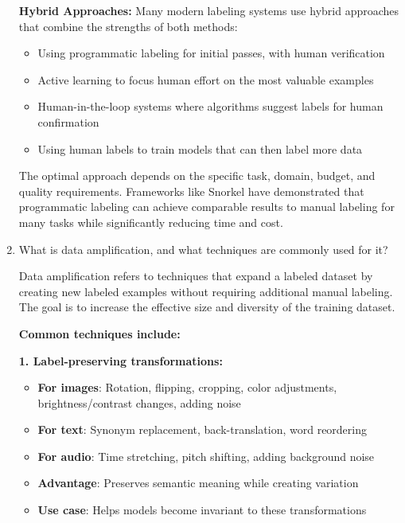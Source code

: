 \documentclass[12pt]{article}
\begin{document}
\begin{enumerate}
\begin{tcolorbox}[colback=blue!5!white,colframe=blue!75!black,title={Solution}]
    \textbf{Hybrid Approaches:}
    Many modern labeling systems use hybrid approaches that combine the strengths of both methods:
    \begin{itemize}
        \item Using programmatic labeling for initial passes, with human verification
        \item Active learning to focus human effort on the most valuable examples
        \item Human-in-the-loop systems where algorithms suggest labels for human confirmation
        \item Using human labels to train models that can then label more data
    \end{itemize}
    
    The optimal approach depends on the specific task, domain, budget, and quality requirements. Frameworks like Snorkel have demonstrated that programmatic labeling can achieve comparable results to manual labeling for many tasks while significantly reducing time and cost.
    \end{tcolorbox}
    
    \item What is data amplification, and what techniques are commonly used for it?
    
    \begin{tcolorbox}[colback=blue!5!white,colframe=blue!75!black,title={Solution}]
    Data amplification refers to techniques that expand a labeled dataset by creating new labeled examples without requiring additional manual labeling. The goal is to increase the effective size and diversity of the training dataset.
    
    \textbf{Common techniques include:}
    
    \textbf{1. Label-preserving transformations:}
    \begin{itemize}
        \item \textbf{For images}: Rotation, flipping, cropping, color adjustments, brightness/contrast changes, adding noise
        \item \textbf{For text}: Synonym replacement, back-translation, word reordering
        \item \textbf{For audio}: Time stretching, pitch shifting, adding background noise
        \item \textbf{Advantage}: Preserves semantic meaning while creating variation
        \item \textbf{Use case}: Helps models become invariant to these transformations
    \end{itemize}
    

\end{tcolorbox}
\end{enumerate}
\end{document}

